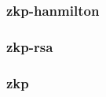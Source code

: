 \begin{frame} \frametitle{zkp-hanmilton}
\begin{figure}
\begin{center}

\end{center}
\end{figure}
\end{frame}
\begin{frame} \frametitle{zkp-rsa}
\begin{figure}
\begin{center}

\end{center}
\end{figure}
\end{frame}
\begin{frame} \frametitle{zkp}
\begin{figure}
\begin{center}

\end{center}
\end{figure}
\end{frame}

